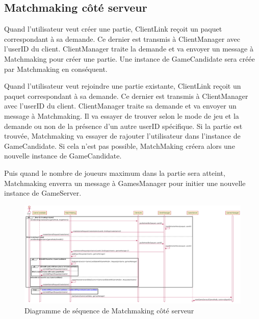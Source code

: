 \documentclass{article}
\begin{document}
%

\subsection{Matchmaking côté serveur}

Quand l'utilisateur veut créer une partie, ClientLink reçoit un paquet correspondant à sa demande. Ce dernier est transmis à ClientManager avec l'userID du client. ClientManager traite la demande et va envoyer un message à Matchmaking pour créer une partie. Une instance de GameCandidate sera créée par Matchmaking en conséquent. 

Quand l'utilisateur veut rejoindre une partie existante, ClientLink reçoit un paquet correspondant à sa demande. Ce dernier est transmis à ClientManager avec l'userID du client. ClientManager traite sa demande et va envoyer un message à Matchmaking. Il va essayer de trouver selon le mode de jeu et la demande ou non de la présence d'un autre userID spécifique. Si la partie est trouvée, Matchmaking va essayer de rajouter l'utilisateur dans l'instance de GameCandidate. Si cela n'est pas possible, MatchMaking créera alors une nouvelle instance de GameCandidate. 

Puis quand le nombre de joueurs maximum dans la partie sera atteint, Matchmaking enverra un message à GamesManager pour initier une nouvelle instance de GameServer.

\begin{figure}[H]
    \centering
    \includegraphics[width=1\textwidth]{../../res/uml/sequence/MatchMakingServerSequence.png}
    \caption{Diagramme de séquence de Matchmaking côté serveur}
    \label{fig:MatchmakingServerDiagram}
\end{figure}
\end{document}
